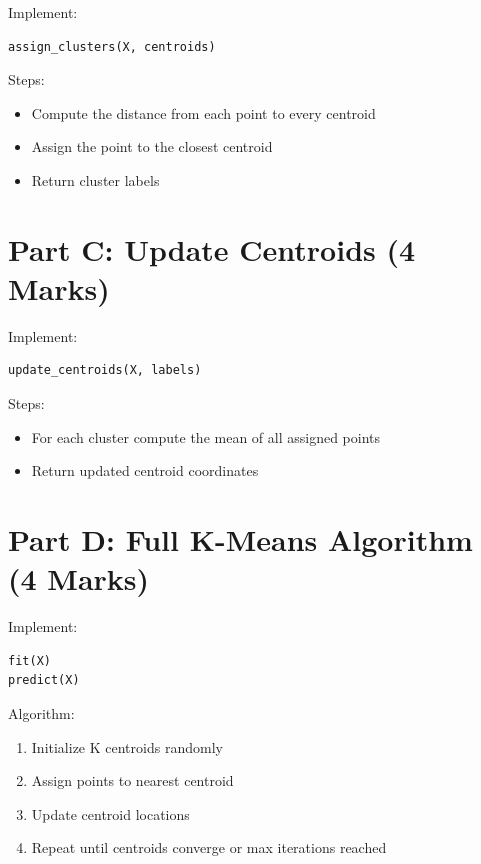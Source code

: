 \documentclass[12pt,a4paper]{article}
\begin{document}
\begin{tcolorbox}

Implement:

\begin{verbatim}
assign_clusters(X, centroids)
\end{verbatim}

Steps:

\begin{itemize}
\item Compute the distance from each point to every centroid
\item Assign the point to the closest centroid
\item Return cluster labels
\end{itemize}

\end{tcolorbox}


\section{Part C: Update Centroids (4 Marks)}

\begin{tcolorbox}

Implement:

\begin{verbatim}
update_centroids(X, labels)
\end{verbatim}

Steps:

\begin{itemize}
\item For each cluster compute the mean of all assigned points
\item Return updated centroid coordinates
\end{itemize}

\end{tcolorbox}


\section{Part D: Full K-Means Algorithm (4 Marks)}

\begin{tcolorbox}

Implement:

\begin{verbatim}
fit(X)
predict(X)
\end{verbatim}

Algorithm:

\begin{enumerate}
\item Initialize K centroids randomly
\item Assign points to nearest centroid
\item Update centroid locations
\item Repeat until centroids converge or max iterations reached
\end{enumerate}

\end{tcolorbox}
\end{document}
